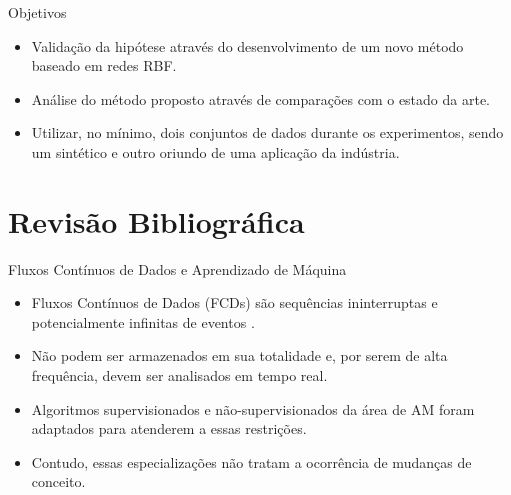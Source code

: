 \documentclass[10pt]{beamer}
\begin{document}
\begin{frame}{Objetivos}
    \begin{itemize}
        \item<1 -> Validação da hipótese através do desenvolvimento de um novo método baseado em redes RBF.
        \item<2 -> Análise do método proposto através de comparações com o estado da arte.
        \item<3 -> Utilizar, no mínimo, dois conjuntos de dados durante os experimentos, sendo um sintético e outro oriundo de uma aplicação da indústria.
      \end{itemize}
\end{frame}

\section{Revisão Bibliográfica}


\begin{frame}{Fluxos Contínuos de Dados e Aprendizado de Máquina}
    \begin{itemize}
        \item<1 -> \alert{Fluxos Contínuos de Dados (FCDs)} são sequências ininterruptas e potencialmente infinitas de eventos \cite{Aggarwal:2006:DSM:1196418}.
        \item<2 -> Não podem ser armazenados em sua totalidade e, por serem de alta frequência, devem ser analisados em tempo real.
        \item<3 -> Algoritmos supervisionados \cite{Domingos:2000:MHD:347090.347107, Bifet:2013:EDS:2480362.2480516, Wang:2003:MCD:956750.956778, Aggarwal:2004:DCD:1014052.1014110, Gama:2003:ADT:956750.956813} e não-supervisionados \cite{Aggarwal:2003:FCE:1315451.1315460, Ackermann:2012:SCA:2133803.2184450, Kranen:2011:CIM:2134350.2134352} da área de AM foram adaptados para atenderem a essas restrições.
        \item<4 -> Contudo, essas especializações não tratam a ocorrência de \alert{mudanças de conceito}.
      \end{itemize}
\end{frame}

\end{document}
